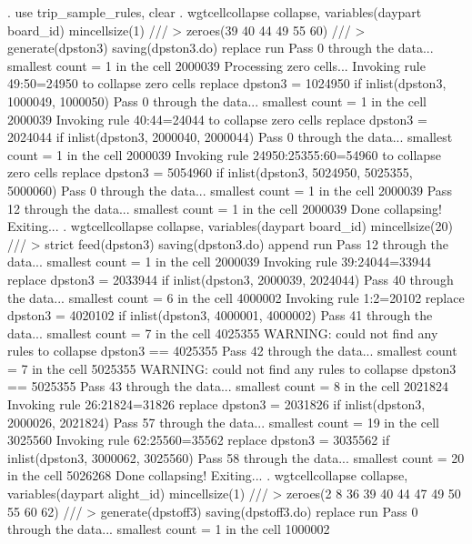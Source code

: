 . use trip_sample_rules, clear
{\smallskip}
. wgtcellcollapse collapse, variables(daypart board_id) mincellsize(1) ///
>         zeroes(39 40 44 49 55 60) ///
>         generate(dpston3) saving(dpston3.do) replace run
Pass 0 through the data...
  smallest count = 1 in the cell      2000039
{\smallskip}
Processing zero cells...
{\smallskip}
  Invoking rule 49:50=24950 to collapse zero cells
  replace dpston3 = 1024950 if inlist(dpston3, 1000049, 1000050)
Pass 0 through the data...
  smallest count = 1 in the cell      2000039
  Invoking rule 40:44=24044 to collapse zero cells
  replace dpston3 = 2024044 if inlist(dpston3, 2000040, 2000044)
\smallskip
\oom
\smallskip
Pass 0 through the data...
  smallest count = 1 in the cell      2000039
  Invoking rule 24950:25355:60=54960 to collapse zero cells
  replace dpston3 = 5054960 if inlist(dpston3, 5024950, 5025355, 5000060)
Pass 0 through the data...
  smallest count = 1 in the cell      2000039
Pass 12 through the data...
  smallest count = 1 in the cell      2000039
  Done collapsing! Exiting...
{\smallskip}
. wgtcellcollapse collapse, variables(daypart board_id) mincellsize(20) ///
>         strict feed(dpston3) saving(dpston3.do) append run
Pass 12 through the data...
  smallest count = 1 in the cell      2000039
  Invoking rule 39:24044=33944
  replace dpston3 = 2033944 if inlist(dpston3, 2000039, 2024044)
\smallskip
\oom
\smallskip
Pass 40 through the data...
  smallest count = 6 in the cell      4000002
  Invoking rule 1:2=20102
  replace dpston3 = 4020102 if inlist(dpston3, 4000001, 4000002)
Pass 41 through the data...
  smallest count = 7 in the cell      4025355
  WARNING: could not find any rules to collapse dpston3 == 4025355
Pass 42 through the data...
  smallest count = 7 in the cell      5025355
  WARNING: could not find any rules to collapse dpston3 == 5025355
Pass 43 through the data...
  smallest count = 8 in the cell      2021824
  Invoking rule 26:21824=31826
  replace dpston3 = 2031826 if inlist(dpston3, 2000026, 2021824)
\smallskip
\oom
\smallskip
Pass 57 through the data...
  smallest count = 19 in the cell      3025560
  Invoking rule 62:25560=35562
  replace dpston3 = 3035562 if inlist(dpston3, 3000062, 3025560)
Pass 58 through the data...
  smallest count = 20 in the cell      5026268
  Done collapsing! Exiting...
{\smallskip}
. wgtcellcollapse collapse, variables(daypart alight_id) mincellsize(1) ///
>         zeroes(2 8 36 39 40 44 47 49 50 55 60 62) ///
>         generate(dpstoff3) saving(dpstoff3.do) replace run
Pass 0 through the data...
  smallest count = 1 in the cell      1000002
